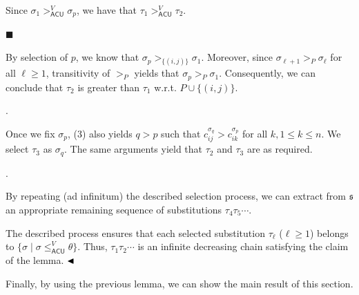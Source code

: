 Since $\sigma_{1}>_{\mathsf{ACU}}^{V}\sigma_{p}$, we have that $\tau_{1}>_{\mathsf{ACU}}^{V}\tau_{2}$.\par
 
 
 
\par\noindent  $\blacksquare$ 
 
By selection of $p$, we know that $\sigma_{p}>_{\{(i,j)\}}\sigma_{1}$. Moreover, since $\sigma_{\ell+1}>_{P}\sigma_{\ell}$ for all $\ell\geq 1$, transitivity of $>_{P}$ yields that $\sigma_{p}>_{P}\sigma_{1}$. Consequently, we can conclude that $\tau_{2}$ is greater than $\tau_{1}$ w.r.t. $P\cup\{(i,j)\}$.\par
 
 
  
 
 
\par{}. 
 
Once we fix $\sigma_{p}$, (3) also yields $q>p$ such that $c^{\sigma_{q}}_{ij}>c^{\sigma_{p}}_{ik}$ for all $k,1\leq k\leq n$. We select $\tau_{3}$ as $\sigma_{q}$. The same arguments yield that $\tau_{2}$ and $\tau_{3}$ are as required.\par
 
 
 
\par{}. 
 
By repeating (ad infinitum) the described selection process, we can extract from $\mathfrak{s}$ an appropriate remaining sequence of substitutions $\tau_{4}\tau_{5}\cdots$.\par
 
 
  
The described process ensures that each selected substitution $\tau_{\ell}$ ($\ell\geq 1$) belongs to $\{\sigma\mid\sigma\leq_{\mathsf{ACU}}^{V}\theta\}$. Thus, $\tau_{1}\tau_{2}\cdots$ is an infinite decreasing chain satisfying the claim of the lemma. $\hfill\blacktriangleleft$\par
 
 
 
Finally, by using the previous lemma, we can show the main result of this section.\par
 
 
